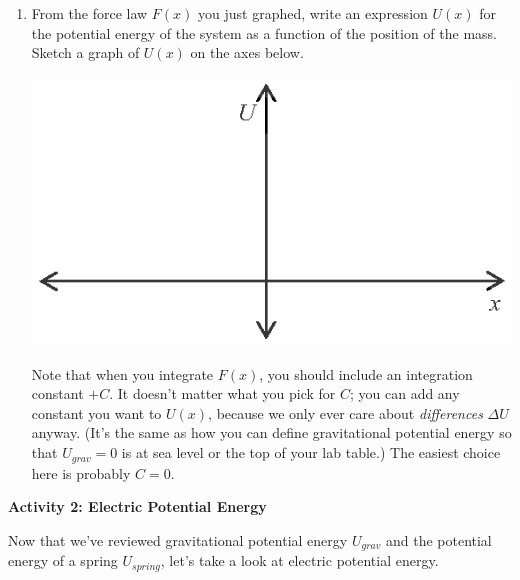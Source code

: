 \begin{enumerate}[wide, label=(\emph{\alph*})]


\item From the force law $F(x)$ you just graphed, write an expression $U(x)$ for the potential energy of the system as a function of the position of the mass.  Sketch a graph of $U(x)$ on the axes below.
\begin{center}
\vspace{-0.1in}
\includegraphics{potential_intro/activity_1_figs/U_axes.eps}
\hspace{1.05in}
\hspace*{1.0in}
\end{center}

Note that when you integrate $F(x)$, you should include an integration constant $+C$.  It doesn't matter what you pick for $C$; you can add any constant you want to $U(x)$, because we only ever care about \textit{differences} $\Delta U$ anyway.  (It's the same as how you can define gravitational potential energy so that $U_{grav}=0$ is at sea level or the top of your lab table.)  The easiest choice here is probably $C=0$.
\end{enumerate}

\pagebreak[2]
\textbf{Activity 2: Electric Potential Energy}

Now that we've reviewed gravitational potential energy $U_{grav}$ and the potential energy of a spring $U_{spring}$, let's take a look at electric potential energy.  

